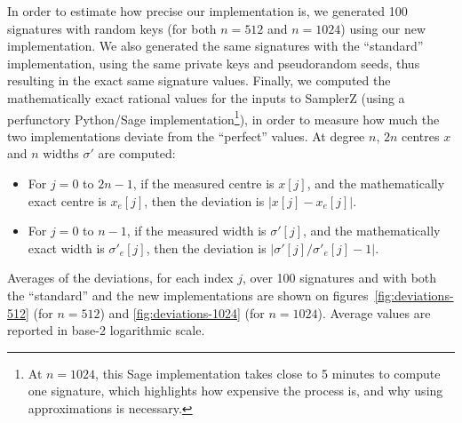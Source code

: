 \documentclass{llncs}
\begin{document}
In order to estimate how precise our implementation is, we generated 100
signatures with random keys (for both $n = 512$ and $n = 1024$) using
our new implementation. We also generated the same signatures with the
``standard'' implementation, using the same private keys and
pseudorandom seeds, thus resulting in the exact same signature values.
Finally, we computed the mathematically exact rational values for the
inputs to \textsf{SamplerZ} (using a perfunctory Python/Sage
implementation\footnote{At $n = 1024$, this Sage implementation takes
close to 5 minutes to compute one signature, which highlights how
expensive the process is, and why using approximations is necessary.}),
in order to measure how much the two implementations deviate from the
``perfect'' values. At degree $n$, $2n$ centres $x$ and $n$ widths
$\sigma'$ are computed:
\begin{itemize}

    \item For $j = 0$ to $2n - 1$, if the measured centre is $x[j]$, and
    the mathematically exact centre is $x_e[j]$, then the deviation is
    $|x[j] - x_e[j]|$.

    \item For $j = 0$ to $n - 1$, if the measured width is $\sigma'[j]$,
    and the mathematically exact width is $\sigma'_e[j]$, then the deviation
    is $|\sigma'[j]/\sigma'_e[j] - 1|$.

\end{itemize}
Averages of the deviations, for each index $j$, over 100 signatures and
with both the ``standard'' and the new implementations are shown on
figures~\ref{fig:deviations-512} (for $n = 512$) and
\ref{fig:deviations-1024} (for $n = 1024$). Average values are reported
in base-2 logarithmic scale.
\end{document}
